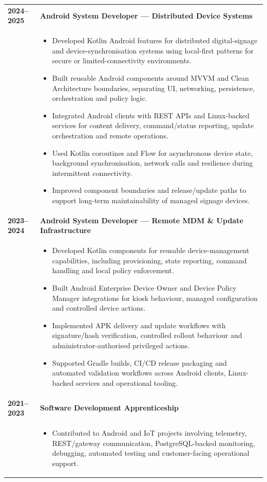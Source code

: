 \documentclass[11pt,a4paper]{article}
\begin{document}
\begin{tabularx}{\textwidth}{>{\raggedleft\arraybackslash}p{2.4cm} !{\color{timelinegray}\vrule width 0.8pt} >{\raggedright\arraybackslash}X}
\textbf{\color{timelineblue}2024--2025} &
\textbf{Android System Developer --- Distributed Device Systems}\\
& {\footnotesize\color{timelinegray}
\begin{itemize}
    \item Developed Kotlin Android features for distributed digital-signage and device-synchronisation systems using local-first patterns for secure or limited-connectivity environments.
    \item Built reusable Android components around MVVM and Clean Architecture boundaries, separating UI, networking, persistence, orchestration and policy logic.
    \item Integrated Android clients with REST APIs and Linux-backed services for content delivery, command/status reporting, update orchestration and remote operations.
    \item Used Kotlin coroutines and Flow for asynchronous device state, background synchronisation, network calls and resilience during intermittent connectivity.
    \item Improved component boundaries and release/update paths to support long-term maintainability of managed signage devices.
\end{itemize}} \\[2pt]

\textbf{\color{timelineblue}2023--2024} &
\textbf{Android System Developer --- Remote MDM \& Update Infrastructure}\\
& {\footnotesize\color{timelinegray}
\begin{itemize}
    \item Developed Kotlin components for reusable device-management capabilities, including provisioning, state reporting, command handling and local policy enforcement.
    \item Built Android Enterprise Device Owner and Device Policy Manager integrations for kiosk behaviour, managed configuration and controlled device actions.
    \item Implemented APK delivery and update workflows with signature/hash verification, controlled rollout behaviour and administrator-authorised privileged actions.
    \item Supported Gradle builds, CI/CD release packaging and automated validation workflows across Android clients, Linux-backed services and operational tooling.
\end{itemize}} \\[2pt]

\textbf{\color{timelineblue}2021--2023} &
\textbf{Software Development Apprenticeship}\\
& {\scriptsize\color{timelinegray}
\begin{itemize}
    \item Contributed to Android and IoT projects involving telemetry, REST/gateway communication, PostgreSQL-backed monitoring, debugging, automated testing and customer-facing operational support.
\end{itemize}}
\end{tabularx}
\end{document}
